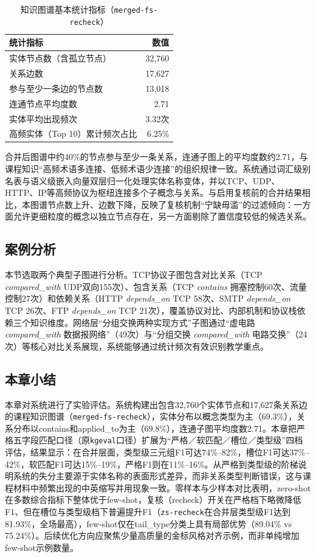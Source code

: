 \begin{table}[ht]
    \centering
    \caption{知识图谱基本统计指标（\texttt{merged-fs-recheck}）}
    \label{tab:5-9}
    \begin{tabular}{lr}
    \toprule
    \textbf{统计指标} & \textbf{数值} \\
    \midrule
    实体节点数（含孤立节点） & 32,760 \\
    关系边数 & 17,627 \\
    参与至少一条边的节点数 & 13,018 \\
    连通节点平均度数 & 2.71 \\
    实体平均出现频次 & 3.32次 \\
    高频实体（Top 10）累计频次占比 & 6.25\% \\
    \bottomrule
    \end{tabular}
\end{table}

合并后图谱中约40\%的节点参与至少一条关系，连通子图上的平均度数约2.71，与课程知识“高频术语多连接、低频术语少连接”的组织规律一致。系统通过词汇级别名表与语义级嵌入向量双层归一化处理实体名称变体，并以TCP、UDP、HTTP、IP等高频协议为枢纽连接多个子概念与关系。与启用复核前的合并结果相比，本图谱节点数上升、边数下降，反映了复核机制“宁缺毋滥”的过滤倾向：一方面允许更细粒度的概念以独立节点存在，另一方面剔除了置信度较低的候选关系。

\subsection{案例分析}

本节选取两个典型子图进行分析。TCP协议子图包含对比关系（TCP \textit{compared\_with} UDP双向155次）、包含关系（TCP \textit{contains} 拥塞控制60次、流量控制27次）和依赖关系（HTTP \textit{depends\_on} TCP 58次、SMTP \textit{depends\_on} TCP 26次、FTP \textit{depends\_on} TCP 21次），覆盖协议对比、内部机制和协议栈依赖三个知识维度。网络层“分组交换两种实现方式”子图通过“虚电路 \textit{compared\_with} 数据报网络”（49次）与“分组交换 \textit{compared\_with} 电路交换”（24次）等核心对比关系展现，系统能够通过统计频次有效识别教学重点。


\subsection{本章小结}

本章对系统进行了实验评估。系统构建出包含32,760个实体节点和17,627条关系边的课程知识图谱（\texttt{merged-fs-recheck}），实体分布以概念类型为主（69.3\%），关系分布以contains和applied\_to为主（69.8\%），连通子图平均度数2.71。本章把严格五字段匹配口径（原\texttt{kgeval}口径）扩展为“严格／软匹配／槽位／类型级”四档评估，结果显示：在合并层面，类型级三元组F1可达74\%--82\%，槽位F1可达37\%--42\%，软匹配F1可达15\%--19\%，严格F1则在11\%--16\%。从严格到类型级的阶梯说明系统的失分主要源于实体名称的表面形式差异，而非关系类型判断错误，这与课程材料中频繁出现的中英缩写并用现象一致。零样本与少样本对比表明，zero-shot在多数综合指标下整体优于few-shot，复核（recheck）开关在严格档下略微降低F1、但在槽位与类型级档下普遍提升F1（\texttt{zs-recheck}在合并层类型级F1达到81.93\%，全场最高），few-shot仅在tail\_type分类上具有局部优势（89.04\% vs 75.24\%）。后续优化方向应聚焦少量高质量的金标风格对齐示例，而非单纯增加few-shot示例数量。
